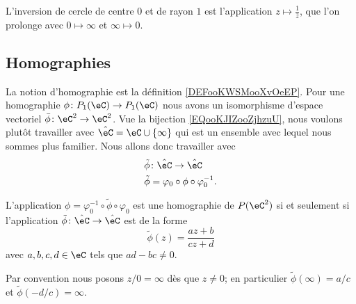 \begin{example}
    L'inversion de cercle de centre \( 0\) et de rayon \( 1\) est l'application \( z\mapsto \frac{1}{ \bar z }\), que l'on prolonge avec \( 0\mapsto \infty\) et \( \infty\mapsto 0\).
\end{example}

\subsection{Homographies}

La notion d'homographie est la définition \ref{DEFooKWSMooXvOeEP}. Pour une homographie \( \phi\colon P_1(\eC)\to P_1(\eC)\) nous avons un isomorphisme d'espace vectoriel \( \bar\phi\colon \eC^2\to \eC^2\). Vue la bijection \eqref{EQooKJIZooZjhzuU}, nous voulons plutôt travailler avec \( \hat \eC=\eC\cup\{ \infty \}\) qui est un ensemble avec lequel nous sommes plus familier. Nous allons donc travailler avec
\begin{equation}
    \begin{aligned}
        \tilde \phi&\colon \hat \eC\to \hat \eC \\
        \tilde \phi&=\varphi_0\circ\phi\circ\varphi_0^{-1}.
    \end{aligned}
\end{equation}

\begin{proposition}     \label{PROPooTZJBooPpowOo}
    L'application \( \phi=\varphi_0^{-1}\circ\tilde \phi\circ\varphi_0\) est une homographie de \( P(\eC^2)\) si et seulement si l'application \( \tilde \phi\colon \hat \eC\to \hat \eC\) est de la forme
    \begin{equation}
            \tilde \phi(z)=\frac{ az+b }{ cz+d }
    \end{equation}
    avec \( a,b,c,d\in \eC\) tels que \( ad-bc\neq 0\).

    Par convention nous posons \( z/0=\infty\) dès que \( z\neq 0\); en particulier $\tilde \phi(\infty)=a/c$ et \( \tilde \phi(-d/c)=\infty\).
\end{proposition}

